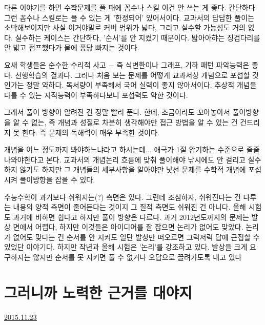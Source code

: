 다른 이야기를 하면 수학문제를 풀 때에 꼼수나 스킬 이건 안 쓰는 게 좋다.
간단하다. 그런 꼼수나 스킬로는 풀 수 있는 게 '한정되어' 있어서이다.
교과서의 답답한 풀이는 소박해보이지만 사실 이거야말로 커버 범위가 넓다, 그리고 실수할 가능성도 거의 없다.
실수하는 케이스는 간단하다, '순서'를 안 지켰기 때문이다. 밟아아햐는 징검다리를 안 밟고 점프했다가 물에 퐁당 빠지는 것이다.
\vspace{5mm}

요새 학생들은 순수한 수리적 사고 $-$ 즉 식변환이나 그래프, 기하 패턴 파악능력은 좋다. 선행학습의 결과다.
그러나 처음 보는 문제를 어떻게 교과서상 개념으로 포섭할 것인가는 정말 약하다.
독서량이 부족해서 국어 실력이 좋지 않아서이다. 추상적 개념을 다룰 수 있는 지적능력이 부족하다보니 포섭력도 약한 것이다.
\vspace{5mm}

그래서 풀이 방향이 알려진 건 정말 빨리 푼다. 한데, 조금이라도 꼬아놓아서 풀이방향을 알 수 없는,
즉 개념과 성질로 차분히 생각해야만 접근 방법을 알 수 있는 건 건드리지 못 한다.
즉 문제의 독해력이 매우 부족한 것이다.
\vspace{5mm}

개념을 어느 정도까지 봐야하느냐라고 하시는데... 애국가 1절 암기하는 수준으로 줄줄 나와야한다고 본다.
교과서의 개념논리 흐름에 맞춰 풀이해야 낚시에도 안 걸리고 실수하지 않기도 하지만
그 개념들의 세부사항을 알아야만 낯선 문제를 수학적 개념에 포섭시켜 풀이방향을 잡을 수 있다.
\vspace{5mm}

수능수학이 과거보다 쉬워지는(?) 측면은 있다. 그런데 조심하자, 쉬워진다는 건 다루는 내용의 양적 측면이 줄어든다는 것이지
그 질적 측면도 쉬워진 건 아니다. 올해 시험도 과거에 비하면 쉽다고 하지만 풀이 방향은 다르다.
과거 2012년도까지의 문제는 발상 면에서 어렵다, 하지만 이것들은 아이디어를 잘 잡으면 논리가 없어도 맞았다.
논리가 없어도 맞다는 건 순서를 안 지켜도 일단 발상만 떠오르면 그럭저럭 답에 근접할 수 있었단 이야기다.
하지만 작년과 올해 시험은 '논리'를 강조하고 있다. 발상을 크게 요구하지는 않지만 순서를 못 지키면 풀 수 없거나
오답으로 끌려가도록 내고 있다
\vspace{5mm}



\section{그러니까 노력한 근거를 대야지}
\href{https://www.kockoc.com/Apoc/505846}{2015.11.23}

\vspace{5mm}


